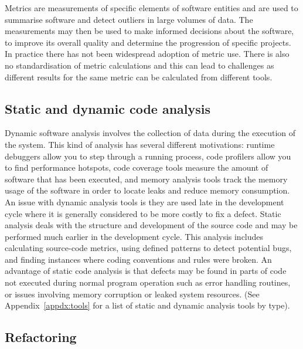 Metrics are measurements of specific elements of software entities and are used to summarise software and detect outliers in large volumes of data. The measurements may then be used to make informed decisions about the software, to improve its overall quality and determine the progression of specific projects. In practice there has not been widespread adoption of metric use. There is also no standardisation of metric calculations and this can lead to challenges as different results for the same metric can be calculated from different tools. 

\subsection{Static and dynamic code analysis}

Dynamic software analysis involves the collection of data during the execution of the system. This kind of analysis has several different motivations: runtime debuggers allow you to step through a running process, code profilers allow you to find performance hotspots, code coverage tools measure the amount of software that has been executed, and memory analysis tools track the memory usage of the software in order to locate leaks and reduce memory consumption. An issue with dynamic analysis tools is they are used late in the development cycle where it is generally considered to be more costly to fix a defect. Static analysis deals with the structure and development of the source code and may be performed much earlier in the development cycle. This analysis includes calculating source-code metrics, using defined patterns to detect potential bugs, and finding instances where coding conventions and rules were broken. An advantage of static code analysis is that defects may be found in parts of code not executed during normal program operation such as error handling routines, or issues involving memory corruption or leaked system resources. (See Appendix~\ref{appdx:tools} for a list of static and dynamic analysis tools by type).

\subsection{Refactoring}

